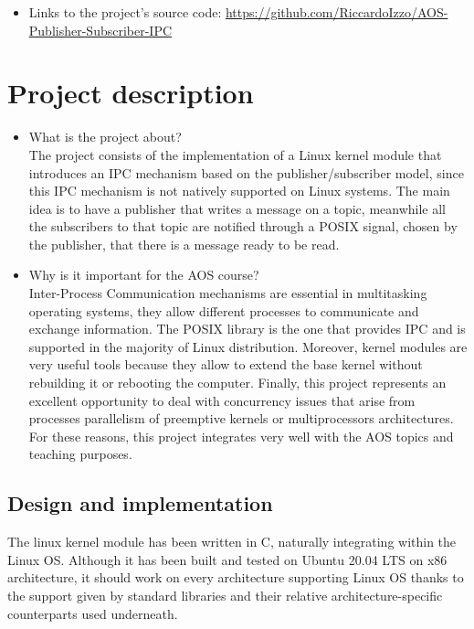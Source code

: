 \documentclass[10pt,a4]{article}
\begin{document}
\begin{itemize}
\item Links to the project's source code: \url{https://github.com/RiccardoIzzo/AOS-Publisher-Subscriber-IPC}

\end{itemize}


\section{Project description}

\begin{itemize}
\item What is the project about?\\
The project consists of the implementation of a Linux kernel module that introduces an IPC mechanism based on the publisher/subscriber model, 
since this IPC mechanism is not natively supported on Linux systems.
The main idea is to have a publisher that writes a message on a topic, meanwhile all the subscribers to that topic are notified through a POSIX signal, chosen by the publisher, that there is a message ready to be read.

\item Why is it important for the AOS course?\\
Inter-Process Communication mechanisms are essential in multitasking operating systems, they allow different processes to communicate and exchange information.
The POSIX library is the one that provides IPC and is supported in the majority of Linux distribution.
Moreover, kernel modules are very useful tools because they allow to extend the base kernel without rebuilding it or rebooting the computer.
Finally, this project represents an excellent opportunity to deal with concurrency issues that arise from processes parallelism of preemptive kernels or multiprocessors architectures. For these reasons, this project integrates very well with the AOS topics and teaching purposes.
\end{itemize}

\subsection{Design and implementation}
The linux kernel module has been written in C, naturally integrating within the Linux OS. Although it has been built and tested on Ubuntu 20.04 LTS on x86 architecture, it should work on every architecture supporting Linux OS thanks to the support given by standard libraries and their relative architecture-specific counterparts used underneath.
\end{document}

